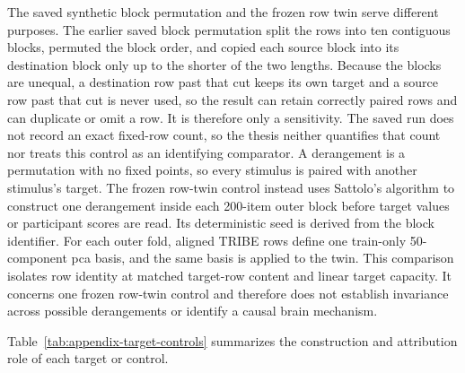 The saved synthetic block permutation and the frozen row twin serve different purposes.
The earlier saved block permutation split the rows into ten contiguous blocks, permuted the block order, and copied each source block into its destination block only up to the shorter of the two lengths.
Because the blocks are unequal, a destination row past that cut keeps its own target and a source row past that cut is never used, so the result can retain correctly paired rows and can duplicate or omit a row.
It is therefore only a sensitivity.
The saved run does not record an exact fixed-row count, so the thesis neither quantifies that count nor treats this control as an identifying comparator.
A derangement is a permutation with no fixed points, so every stimulus is paired with another stimulus's target.
The frozen row-twin control instead uses Sattolo's algorithm to construct one derangement inside each 200-item outer block before target values or participant scores are read.
Its deterministic seed is derived from the block identifier.
For each outer fold, aligned TRIBE rows define one train-only 50-component \ac{pca} basis, and the same basis is applied to the twin.
This comparison isolates row identity at matched target-row content and linear target capacity.
It concerns one frozen row-twin control and therefore does not establish invariance across possible derangements or identify a causal brain mechanism. 

Table~\ref{tab:appendix-target-controls} summarizes the construction and attribution role of each target or control.

